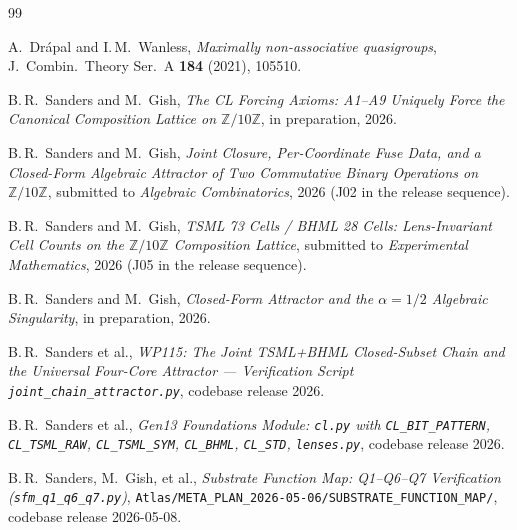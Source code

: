 \documentclass[11pt,reqno]{amsart}
\theoremstyle{definition}
\newcommand{\Z}{\mathbb{Z}}
\begin{document}
\begin{thebibliography}{99}

A.~Drápal and I.\,M.\ Wanless, \emph{Maximally non-associative
quasigroups}, J.\ Combin.\ Theory Ser.\ A \textbf{184} (2021),
105510.

B.\,R.\ Sanders and M.\ Gish, \emph{The CL Forcing Axioms: A1--A9
Uniquely Force the Canonical Composition Lattice on $\Z/10\Z$},
in preparation, 2026.

B.\,R.\ Sanders and M.\ Gish, \emph{Joint Closure, Per-Coordinate
Fuse Data, and a Closed-Form Algebraic Attractor of Two
Commutative Binary Operations on $\Z/10\Z$}, submitted to
\emph{Algebraic Combinatorics}, 2026 (J02 in the release
sequence).

B.\,R.\ Sanders and M.\ Gish, \emph{TSML 73 Cells / BHML 28
Cells: Lens-Invariant Cell Counts on the $\Z/10\Z$ Composition
Lattice}, submitted to \emph{Experimental Mathematics}, 2026
(J05 in the release sequence).

B.\,R.\ Sanders and M.\ Gish, \emph{Closed-Form Attractor and
the $\alpha=1/2$ Algebraic Singularity}, in preparation, 2026.

B.\,R.\ Sanders et al., \emph{WP115: The Joint TSML+BHML
Closed-Subset Chain and the Universal Four-Core Attractor —
Verification Script \texttt{joint\_chain\_attractor.py}},
codebase release 2026.

B.\,R.\ Sanders et al., \emph{Gen13 Foundations Module:
\texttt{cl.py} with \texttt{CL\_BIT\_PATTERN},
\texttt{CL\_TSML\_RAW}, \texttt{CL\_TSML\_SYM},
\texttt{CL\_BHML}, \texttt{CL\_STD}, \texttt{lenses.py}},
codebase release 2026.

B.\,R.\ Sanders, M.\ Gish, et al., \emph{Substrate Function Map:
Q1--Q6--Q7 Verification (\texttt{sfm\_q1\_q6\_q7.py})},
\texttt{Atlas/META\_PLAN\_2026-05-06/SUBSTRATE\_FUNCTION\_MAP/},
codebase release 2026-05-08.

\end{thebibliography}
\end{document}
